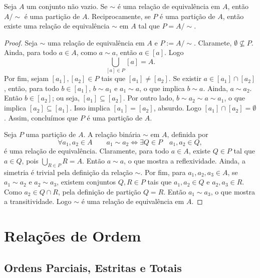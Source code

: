 \begin{teo}
\label{conj:teo.rel.equiv.part}
	Seja $A$ um conjunto não vazio. Se $\sim$ é uma relação de equivalência em $A$, então $A/\sim$ é uma partição de $A$. Reciprocamente, se $P$ é uma partição de $A$, então existe uma relação de equivalência $\sim$ em $A$ tal que $P=A/\sim$.
\end{teo}
\begin{proof}
	Seja $\sim$ uma relação de equivalência em $A$ e $P := A/\sim$. Claramete, $\emptyset \nsubseteq P$. Ainda, para todo $a \in A$, como $a \sim a$, então $a \in [a]$. Logo
	\begin{equation*}
	\bigcup_{[a] \in P} [a] = A.
	\end{equation*}
Por fim, sejam $[a_1],[a_2] \in P$ tais que $[a_1] \neq [a_2]$. Se existir $a \in [a_1] \cap [a_2]$, então, para todo $b \in [a_1]$, $b \sim a_1$ e $a_1 \sim a$, o que implica $b \sim a$. Ainda, $a \sim a_2$. Então $b \in [a_2]$; ou seja, $[a_1] \subseteq [a_2]$. Por outro lado, $b \sim a_2 \sim a \sim a_1$, o que implica $[a_2] \subseteq [a_1]$. Isso implica $[a_1]=[a_2]$, absurdo. Logo $[a_1] \cap [a_2]=\emptyset$. Assim, concluímos que $P$ é uma partição de $A$.
	
	Seja $P$ uma partição de $A$. A relação binária $\sim$ em $A$, definida por
	\begin{equation*}
	\forall a_1,a_2 \in A \qquad a_1 \sim a_2 \Leftrightarrow \exists Q \in P \quad a_1,a_2 \in Q,
	\end{equation*}
é uma relação de equivalência. Claramente, para todo $a \in A$, existe $Q \in P$ tal que $a \in Q$, pois $\displaystyle \bigcup_{R \in P} R = A$. Então $a \sim a$, o que mostra a reflexividade. Ainda, a simetria é trivial pela definição da relação $\sim$. Por fim, para $a_1,a_2,a_3 \in A$, se $a_1 \sim a_2$ e $a_2 \sim a_3$, existem conjuntos $Q,R \in P$ tais que $a_1,a_2 \in Q$ e $a_2,a_3 \in R$. Como $a_2 \in Q \cap R$, pela definição de partição $Q=R$. Então $a_1 \sim a_3$, o que mostra a transitividade. Logo $\sim$ é uma relação de equivalência em $A$.
\end{proof}



\section{Relações de Ordem}

\subsection{Ordens Parciais, Estritas e Totais}

